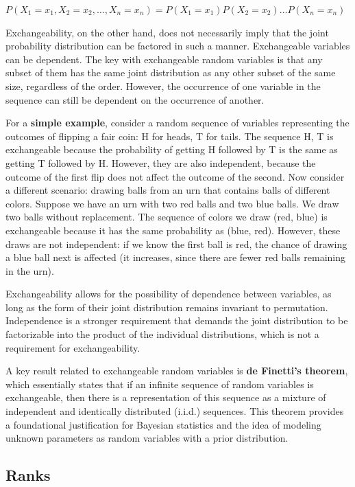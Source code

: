 \documentclass{article}
\begin{document}
$ P(X_1 = x_1, X_2 = x_2, \ldots, X_n = x_n) = P(X_1 = x_1)P(X_2 = x_2) \ldots P(X_n = x_n)$

Exchangeability, on the other hand, does not necessarily imply that the joint probability distribution can be factored in such a manner. Exchangeable variables can be dependent. The key with exchangeable random variables is that any subset of them has the same joint distribution as any other subset of the same size, regardless of the order. However, the occurrence of one variable in the sequence can still be dependent on the occurrence of another.

For a\textbf{ simple example}, consider a random sequence of variables representing the outcomes of flipping a fair coin: H for heads, T for tails. The sequence H, T is exchangeable because the probability of getting H followed by T is the same as getting T followed by H. However, they are also independent, because the outcome of the first flip does not affect the outcome of the second.
Now consider a different scenario: drawing balls from an urn that contains balls of different colors. Suppose we have an urn with two red balls and two blue balls. We draw two balls without replacement. The sequence of colors we draw (red, blue) is exchangeable because it has the same probability as (blue, red). However, these draws are not independent: if we know the first ball is red,
the chance of drawing a blue ball next is affected (it increases, since there are fewer red balls remaining in the urn).

Exchangeability allows for the possibility of dependence between variables, as long as the form of their joint distribution remains invariant to permutation. Independence is a stronger requirement that demands the joint distribution to be factorizable into the product of the individual distributions, which is not a requirement for exchangeability.

A key result related to exchangeable random variables is \textbf{de Finetti's theorem}, which essentially states that if an infinite sequence of random variables is exchangeable, then there is a representation of this sequence as a mixture of independent and identically distributed (i.i.d.) sequences. This theorem provides a foundational justification for Bayesian statistics and the idea of modeling unknown parameters as random variables with a prior distribution.

\subsection{Ranks}
\end{document}
